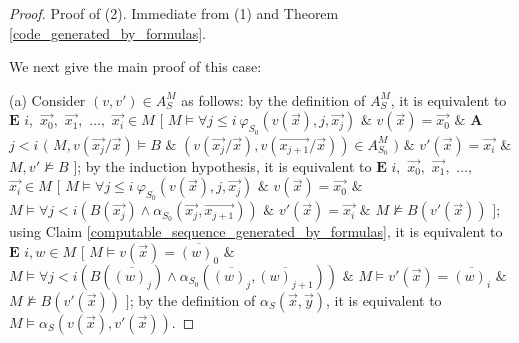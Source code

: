 \documentclass[a4paper,11pt]{article}
\begin{document}
\begin{proof}
Proof of (2). Immediate from (1) and Theorem \ref{code_generated_by_formulas}.

We next give the main proof of this case:

(a) Consider $(v,v')\in A_S^M$ as follows: by the definition of $A_S^M$, it is equivalent to $\textbf{E}$ $i,$ $\vec{x_0},$ $\vec{x_1},$ $\ldots,$ $\vec{x_i}\in M$ $[$ $M\models \forall j\leq i ~ \varphi_{S_0}(v(\vec{x}),j,\vec{x_j})$ $\&$ $v(\vec{x}) = \vec{x_0}$ $\&$ $\textbf{A}$ $j< i$ $($ $M,v(\vec{x_j}/\vec{x})\models B$ $\&$ $(v(\vec{x_j}/\vec{x}), v(\vec{x_{j+1}}/\vec{x}) ) \in A_{S_0}^M$ $)$ $\&$ $v'(\vec{x}) = \vec{x_i}$ $\&$ $M,v'\not\models B$ $]$; by the induction hypothesis, it is equivalent to $\textbf{E}$ $i,$ $\vec{x_0},$ $\vec{x_1},$ $\ldots,$ $\vec{x_i}\in M$ $[$ $M\models \forall j\leq i ~ \varphi_{S_0}(v(\vec{x}),j,\vec{x_j})$ $\&$ $v(\vec{x}) = \vec{x_0}$ $\&$ $M \models \forall j< i(B(\vec{x_j})\wedge \alpha_{S_0}(\vec{x_j},\vec{x_{j+1}}) )$ $\&$ $v'(\vec{x}) = \vec{x_i}$ $\&$ $M \not\models B(v'(\vec{x}))$ $]$; using Claim \ref{computable_sequence_generated_by_formulas}, it is equivalent to $\textbf{E}$ $i,w\in M$ $[$ $M\models v(\vec{x}) = \overline{(w)_0}$ $\&$ $M\models \forall j<i ( B(\overline{(w)_j}) \wedge \alpha_{S_0}(\overline{(w)_j}, \overline{(w)_{j+1}}) )$ $\&$ $M\models v'(\vec{x}) = \overline{(w)_i}$ $\&$ $M\not\models B(v'(\vec{x}))$ $]$; by the definition of $\alpha_S(\vec{x},\vec{y})$, it is equivalent to $M\models \alpha_S(v(\vec{x}),v'(\vec{x}))$.



\end{proof}
\end{document}
